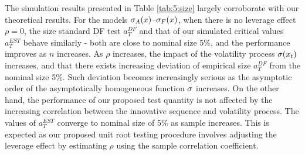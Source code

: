 The simulation results presented in Table \ref{tab:5:size} largely corroborate with our theoretical results. For the models $\sigma_A(x)$--$\sigma_F(x)$, when there is no leverage effect $\rho = 0$, the size standard DF test $a_{T}^{DF}$ and that of our simulated critical values $a_{T}^{EST}$ behave similarly - both are close to nominal size 5\%, and the performance improves as $n$ increases. As $\rho$ increases, the impact of the volatility process $\sigma(x_t)$ increases, and that there exists increasing deviation of empirical size $a_{T}^{DF}$ from the nominal size 5\%. Such deviation becomes increasingly serious as the asymptotic order  of  the asymptotically homogeneous function $\sigma$ increases. On the other hand, the performance of our proposed test quantity is not affected by the increasing correlation between the innovative sequence and volatility process. The values of $a_{T}^{EST}$ converge to nominal size of 5\% as sample increases. This is expected as our proposed unit root testing procedure involves adjusting the leverage effect by estimating $\rho$ using the sample correlation coefficient.
\begin{table}[!ht] 
\selectfont \caption{The empirical size of unit root test based on standard critical values $\Psi(W)$ and simulated critical values $T( \widehat{\al}^*_{n,T} - 1)$.}
\label{GseqTable} 
\end{table}


